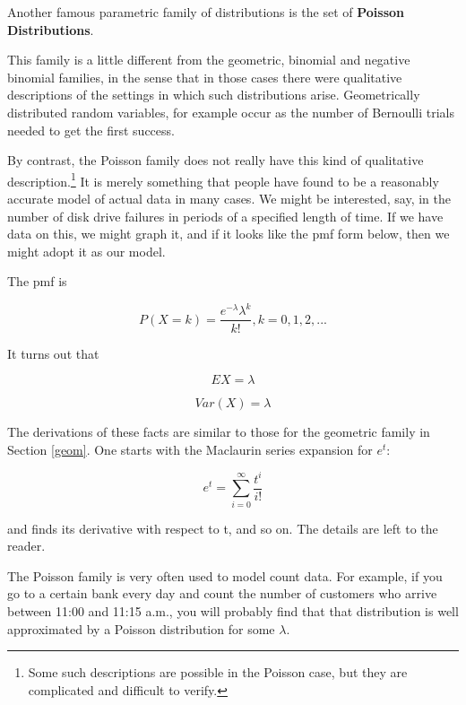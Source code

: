Another famous parametric family of distributions is the set of {\bf
Poisson Distributions}.  

This family is a little different from the geometric, binomial and
negative binomial families, in the sense that in those cases there were
qualitative descriptions of the settings in which such distributions
arise.  Geometrically distributed random variables, for example occur as
the number of Bernoulli trials needed to get the first success.

By contrast, the Poisson family does not really have this kind of
qualitative description.\footnote{Some such descriptions are possible in
the Poisson case, but they are complicated and difficult to verify.} It
is merely something that people have found to be a reasonably accurate
model of actual data in many cases.  We might be interested, say, in the
number of disk drive failures in periods of a specified length of time.
If we have data on this, we might graph it, and if it looks like the pmf
form below, then we might adopt it as our model.

The pmf is

\begin{equation}
\label{poispmf}
P(X = k) = \frac{e^{- \lambda} \lambda^k}{k!}, k = 0,1,2,...
\end{equation}

It turns out that

\begin{equation}
EX = \lambda
\end{equation}

\begin{equation}
Var(X) = \lambda
\end{equation}

The derivations of these facts are similar to those for the geometric
family in Section \ref{geom}.  One starts with the Maclaurin series
expansion for $e^t$:

\begin{equation}
e^t = \sum_{i=0}^{\infty} \frac{t^i}{i!}
\end{equation}

and finds its derivative with respect to t, and so on.  The details are
left to the reader.

\label{bankex}
The Poisson family is very often used to model count data.  For example,
if you go to a certain bank every day and count the number of customers
who arrive between 11:00 and 11:15 a.m., you will probably find that that
distribution is well approximated by a Poisson distribution for some
$\lambda$.


